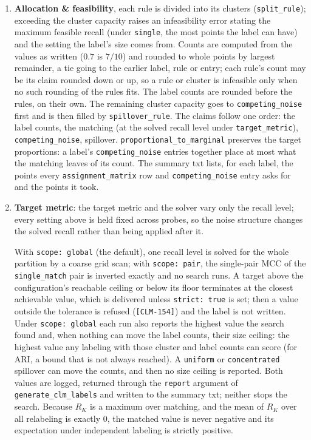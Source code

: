 \documentclass[a4paper,12pt]{article}
\begin{document}
\begin{enumerate}
\begin{itemize}
    \end{itemize}
    \item \textbf{Allocation \& feasibility}, each rule is divided into its clusters (\texttt{split\_rule}); exceeding the cluster capacity raises an infeasibility error stating the maximum feasible recall (under \texttt{single}, the most points the label can have) and the setting the label's size comes from. Counts are computed from the values as written ($0.7$ is $7/10$) and rounded to whole points by largest remainder, a tie going to the earlier label, rule or entry; each rule's count may be its claim rounded down or up, so a rule or cluster is infeasible only when no such rounding of the rules fits. The label counts are rounded before the rules, on their own. The remaining cluster capacity goes to \texttt{competing\_noise} first and is then filled by \texttt{spillover\_rule}. The claims follow one order: the label counts, the matching (at the solved recall level under \texttt{target\_metric}), \texttt{competing\_noise}, spillover. \texttt{proportional\_to\_marginal} preserves the target proportions: a label's \texttt{competing\_noise} entries together place at most what the matching leaves of its count. The summary txt lists, for each label, the points every \texttt{assignment\_matrix} row and \texttt{competing\_noise} entry asks for and the points it took.
    
    \item \textbf{Target metric}: the target metric and the solver vary only the recall level; every setting above is held fixed across probes, so the noise structure changes the solved recall rather than being applied after it.

With \texttt{scope: global} (the default), one recall level is solved for the whole partition by a coarse grid scan; with \texttt{scope: pair}, the single-pair MCC of the \texttt{single\_match} pair is inverted exactly and no search runs. A target above the configuration's reachable ceiling or below its floor terminates at the closest achievable value, which is delivered unless \texttt{strict: true} is set; then a value outside the tolerance is refused (\texttt{[CLM-154]}) and the label is not written. Under \texttt{scope: global} each run also reports the highest value the search found and, when nothing can move the label counts, their size ceiling: the highest value any labeling with those cluster and label counts can score (for ARI, a bound that is not always reached). A \texttt{uniform} or \texttt{concentrated} spillover can move the counts, and then no size ceiling is reported. Both values are logged, returned through the \texttt{report} argument of \texttt{generate\_clm\_labels} and written to the summary txt; neither stops the search. Because $R_K$ is a maximum over matching, and the mean of $R_K$ over all relabeling is exactly $0$, the matched value is never negative and its expectation under independent labeling is strictly positive. 
    

\end{enumerate}
\end{document}
